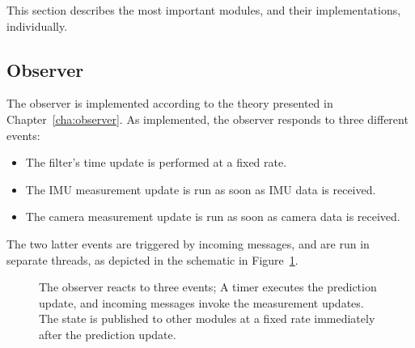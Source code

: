         This section describes the most important modules, and their implementations, individually.
        \subsection{Observer}
            The observer is implemented according to the theory presented in Chapter~\ref{cha:observer}.
            As implemented, the observer responds to three different events:
            \begin{itemize}
                \item The filter's time update is performed at a fixed rate.
                \item The IMU measurement update is run as soon as IMU data is received.
                \item The camera measurement update is run as soon as camera data is received.
            \end{itemize}
            The two latter events are triggered by incoming messages, and are run in
            separate threads, as depicted in the schematic in Figure~\ref{fig:crap:observer}.

            \begin{figure}[H]
                \noindent{}
                \caption{The observer reacts to three events; A timer executes the prediction update, and incoming messages invoke the measurement updates. The state is published to other modules at a fixed rate immediately after the prediction update.}
                \label{fig:crap:observer}
            \end{figure}
